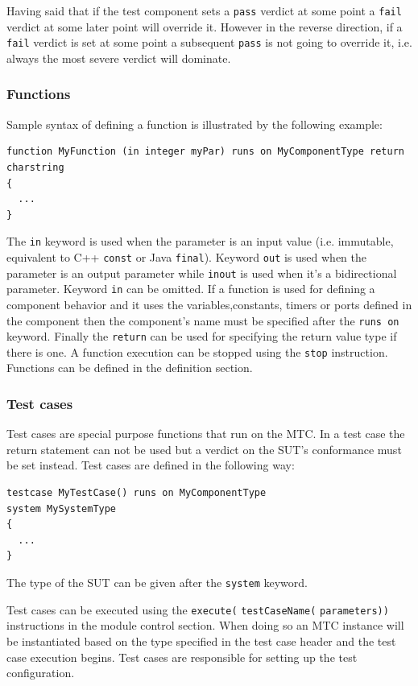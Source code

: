 \documentclass[a4paper]{article}
\begin{document}
Having said that if the test component sets a \verb/pass/ verdict at some point a
\verb/fail/ verdict at some later point will override it. However in the reverse direction, if a
\verb/fail/ verdict is set at some point a subsequent \verb/pass/ is not going to
override it, i.e. always the most severe verdict will dominate.

\subsubsection{Functions}

Sample syntax of defining a function is illustrated by the following example:
{\footnotesize
\begin{lstlisting}
function MyFunction (in integer myPar) runs on MyComponentType return charstring
{
  ...
}
\end{lstlisting}
}
The \verb/in/ keyword is used when the parameter is an input value (i.e. immutable, equivalent to
C++ \verb/const/ or Java \verb/final/). Keyword \verb/out/ is used
when the parameter is an output parameter while \verb/inout/ is used when it's a bidirectional
parameter. Keyword \verb/in/ can be omitted.
If a function is used for defining a component behavior and it uses the variables,constants, timers or ports defined in
the component then the component's name must be specified after the \verb/runs on/ keyword. Finally the
\verb/return/ can be used for specifying the return value type if there is one.
A function execution can be stopped using the \verb/stop/ instruction.
Functions can be defined in the definition section.

\subsubsection{Test cases}
Test cases are special purpose functions that run on the MTC. In a test case the return statement can not be used but a
verdict on the SUT's conformance must be set instead. Test cases are defined in the following way:
{\footnotesize
\begin{lstlisting}
testcase MyTestCase() runs on MyComponentType
system MySystemType
{
  ...
}
\end{lstlisting}
}
The type of the SUT can be given after the \verb.system. keyword.

Test cases can be executed using the \verb/execute(/ \verb/testCaseName(/
\verb/parameters))/ instructions in the module control section. When doing so an MTC instance will be
instantiated based on the type specified in the test case header and the test case execution begins. Test cases are
responsible for setting up the test configuration.
\end{document}
